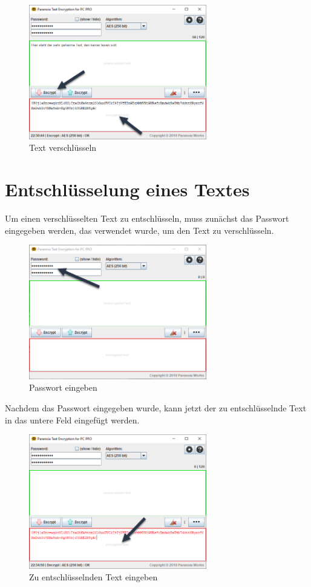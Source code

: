 \documentclass[12pt,a4paper]{scrreprt}
\begin{document}
\begin{figure}[h]
\begin{center}
\includegraphics[width=220pt]{media/pte3.png}
\caption{Text verschlüsseln}
\label{pte3}
\end{center}
\end{figure}

\section{Entschlüsselung eines Textes}
Um einen verschlüsselten Text zu entschlüsseln, muss zunächst das Passwort eingegeben werden, das verwendet wurde, um den Text zu verschlüsseln.

\begin{figure}[h]
\begin{center}
\includegraphics[width=220pt]{media/pte1.png}
\caption{Passwort eingeben}
\label{pte4}
\end{center}
\end{figure}

\newpage

\noindent Nachdem das Passwort eingegeben wurde, kann jetzt der zu entschlüsselnde Text in das untere Feld eingefügt werden.

\begin{figure}[h]
\begin{center}
\includegraphics[width=220pt]{media/pte4.png}
\caption{Zu entschlüsselnden Text eingeben}
\label{pte5}
\end{center}
\end{figure}
\end{document}
